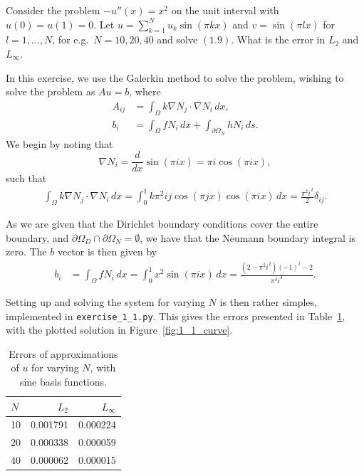 \begin{exercise}
    Consider the problem $-u''(x) = x^2$ on the unit interval with $u(0) = u(1) = 0$.
    Let $u = \sum_{k = 1}^N u_k \sin{(\pi k x)}$ and $v = \sin{(\pi l x)}$ for $l = 1, \ldots, N$, for e.g.\ $N = 10, 20, 40$ and solve $(1.9)$.
    What is the error in $L_2$ and $L_\infty$.
\end{exercise}

\begin{solution}
    In this exercise, we use the Galerkin method to solve the problem, wishing to solve the problem as $Au = b$, where
    \begin{align*}
        A_{ij} &= \int_\Omega k \nabla N_j \cdot \nabla N_i \, dx, \\
        b_i &= \int_\Omega f N_i \, dx + \int_{\partial \Omega_N} h N_i \, ds.
    \end{align*}
    We begin by noting that
    \begin{equation*}
        \nabla N_i = \frac{d}{dx} \sin{(\pi i x)} = \pi i \cos{(\pi i x)},
    \end{equation*}
    such that
    \begin{align*}
        \int_\Omega k \nabla N_j \cdot \nabla N_i \, dx
        = \int_0^1 k \pi^2 i j \cos{(\pi j x)} \cos{(\pi i x)} \, dx
        = \frac{\pi^2 i^2}{2} \delta_{ij}.
    \end{align*}

    As we are given that the Dirichlet boundary conditions cover the entire boundary, and $\partial \Omega_D \cap \partial \Omega_N = \emptyset$, we have that the Neumann boundary integral is zero.
    The $b$ vector is then given by
    \begin{align*}
        b_i &= \int_\Omega f N_i \, dx
        = \int_0^1 x^2 \sin{(\pi i x)} \, dx
        = \frac{(2 - \pi^2 i^2)(-1)^i- 2}{\pi^3 i^3}.
    \end{align*}

    Setting up and solving the system for varying $N$ is then rather simples, implemented in \verb|exercise_1_1.py|.
    This gives the errors presented in Table~\ref{tab:1_1}, with the plotted solution in Figure~\ref{fig:1_1_curve}.
    \begin{table}[!h]
        \caption{Errors of approximations of $u$ for varying $N$, with sine basis functions.\label{tab:1_1}}
        \centering
        \begin{tabular}{lrr}
            \toprule
            $N$ & $L_2$ & $L_\infty$ \\
            \midrule
            10 & 0.001791 & 0.000224 \\
            20 & 0.000338 & 0.000059 \\
            40 & 0.000062 & 0.000015 \\
            \bottomrule
        \end{tabular}
    \end{table}


\end{solution}

